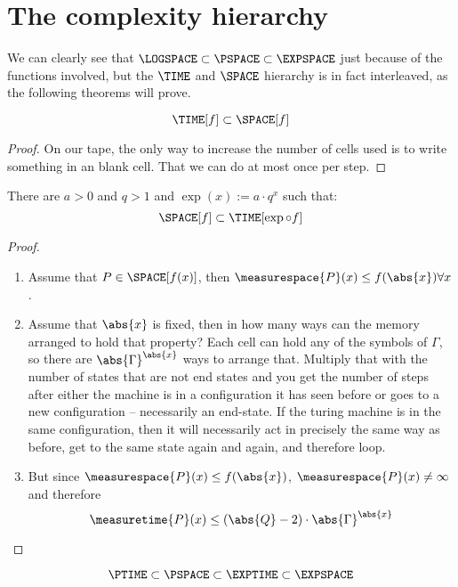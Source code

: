 \section{The complexity hierarchy}
We can clearly see that $\LOGSPACE\subset \PSPACE\subset\EXPSPACE$ just because of 
the functions involved, but the $\TIME$ and $\SPACE$ 
hierarchy is in fact interleaved, as the following theorems will prove.
\begin{theorem}
	\[\TIME[f] \subset \SPACE[f]\]
\end{theorem}
\begin{proof}
	On our tape, the only way to increase the number of cells used is to write 
	something in an blank cell. That we can do at most once per step.
\end{proof}

\begin{theorem}
	There are $a>0$ and $q > 1$ and $\exp(x) := a\cdot q^x$ such that:
	\[\SPACE[f] \subset \TIME[\exp\circ f]\]
\end{theorem}
\begin{proof}
	\begin{enumerate}
		\item Assume that $P\in\SPACE[f(x)]$, then $\measurespace{P}(x)\leq f(\abs{x})\forall x$.
		\item Assume that $\abs{x}$ is fixed, then in how many ways can the 
			memory arranged to hold that property? Each cell can hold any of the 
			symbols of $\Gamma$, so there are $\abs{\Gamma}^{\abs{x}}$ ways to 
			arrange that. Multiply that with the number of states that are not end 
			states and you get the number of steps after either the machine is in a 
			configuration it has seen before or goes to a new configuration -- 
			necessarily an end-state. If the turing machine is in the same 
			configuration, then it will necessarily act in precisely the same way 
			as before, get to the same state again and again, and therefore loop. 
		\item But since $\measurespace{P}(x)\leq f(\abs{x})$, 
			$\measurespace{P}(x) \neq \infty$ and therefore 
			\[\measuretime{P}(x)\leq (\abs{Q} - 2)\cdot\abs{\Gamma}^{\abs{x}}\]
	\end{enumerate}
\end{proof}

\begin{corrolary}
	\[ %
		\PTIME\subset\PSPACE\subset\EXPTIME\subset\EXPSPACE \]
\end{corrolary}
